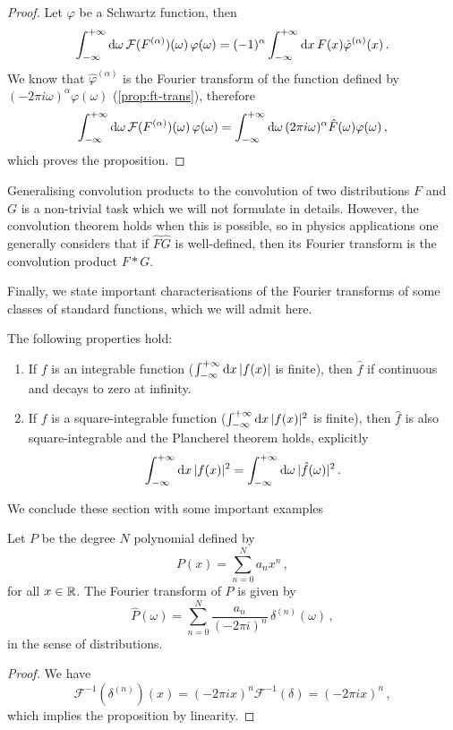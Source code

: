 \begin{proof}
  Let $\varphi$ be a Schwartz function, then
  \begin{equation}
    \int_{-\infty}^{+\infty}\mathrm{d}{\omega}\,\mathcal{F}(F^{(\alpha)})(\omega)\,\varphi(\omega)
    =(-1)^{\alpha}\int_{-\infty}^{+\infty}\mathrm{d}{x}\,F(x)\hat{\varphi}^{(\alpha)}(x)\,.
  \end{equation}
  We know that $\hat{\varphi}^{(\alpha)}$ is the Fourier transform
  of the function defined
  by $(-2\pi i\omega)^\alpha\varphi(\omega)$ (\cf\cref{prop:ft-trans}), therefore
  \begin{equation}
    \int_{-\infty}^{+\infty}\mathrm{d}{\omega}\,\mathcal{F}(F^{(\alpha)})(\omega)\,\varphi(\omega)=
    \int_{-\infty}^{+\infty}\mathrm{d}{\omega}\,(2\pi i\omega)^\alpha\hat{F}(\omega)\varphi(\omega)\,,
  \end{equation}
  which proves the proposition.
\end{proof}
Generalising convolution products to the convolution of two distributions $F$ and $G$ is a
non-trivial task which we will not formulate in details. However, the convolution theorem
holds when this is possible, so in physics applications one generally considers that if
$\hat{F}\hat{G}$ is well-defined, then its Fourier transform is the convolution product
$F\ast G$.

Finally, we state important characterisations of the Fourier transforms of some classes of
standard functions, which we will admit here.
\begin{theorem}
  The following properties hold:
  \begin{enumerate}
    \item If $f$ is an integrable function (\ie $\int_{-\infty}^{+\infty}\mathrm{d}{x}\,|f(x)|$ is finite), then
      $\hat{f}$ if continuous and decays to zero at infinity.
    \item If $f$ is a square-integrable function (\ie $\int_{-\infty}^{+\infty}\mathrm{d}{x}\,|f(x)|^2$ is finite), then
      $\hat{f}$ is also square-integrable and the Plancherel theorem holds, explicitly
      \begin{equation}
        \int_{-\infty}^{+\infty}\mathrm{d}{x}\,|f(x)|^2=\int_{-\infty}^{+\infty}\mathrm{d}{\omega}\,|\hat{f}(\omega)|^2\,.
      \end{equation}
  \end{enumerate}
\end{theorem}
We conclude these section with some important examples
\begin{proposition}
  Let $P$ be the degree $N$ polynomial defined by
  \begin{equation}
    P(x)=\sum_{n=0}^Na_nx^n\,,
  \end{equation}
  for all $x\in\mathbb{R}$. The Fourier transform of $P$ is given by
  \begin{equation}
    \hat{P}(\omega)=\sum_{n=0}^N\frac{a_n}{(-2\pi i)^n}\,\delta^{(n)}(\omega)\,,
  \end{equation}
  in the sense of distributions.
\end{proposition}
\begin{proof}
  We have
  \begin{equation}
    \mathcal{F}^{-1}(\delta^{(n)})(x)=(-2\pi i x)^n\mathcal{F}^{-1}(\delta)=
    (-2\pi i x)^n\,,
  \end{equation}
  which implies the proposition by linearity.
\end{proof}

